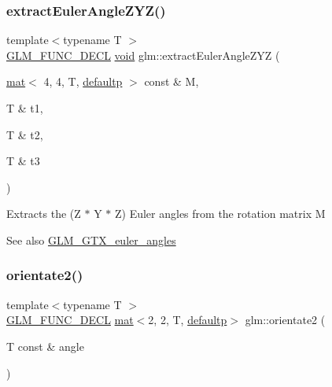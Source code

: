 \subsubsection{\texorpdfstring{extract\+Euler\+Angle\+Z\+Y\+Z()}{extractEulerAngleZYZ()}}
{\footnotesize\ttfamily template$<$typename T $>$ \\
\hyperlink{setup_8hpp_ab2d052de21a70539923e9bcbf6e83a51}{G\+L\+M\+\_\+\+F\+U\+N\+C\+\_\+\+D\+E\+CL} \hyperlink{_s_d_l__opengles2__gl2ext_8h_ae5d8fa23ad07c48bb609509eae494c95}{void} glm\+::extract\+Euler\+Angle\+Z\+YZ (\begin{DoxyParamCaption}\item[{\hyperlink{structglm_1_1mat}{mat}$<$ 4, 4, T, \hyperlink{namespaceglm_a36ed105b07c7746804d7fdc7cc90ff25a9d21ccd8b5a009ec7eb7677befc3bf51}{defaultp} $>$ const \&}]{M,  }\item[{T \&}]{t1,  }\item[{T \&}]{t2,  }\item[{T \&}]{t3 }\end{DoxyParamCaption})}

Extracts the (Z $\ast$ Y $\ast$ Z) Euler angles from the rotation matrix M \begin{DoxySeeAlso}{See also}
\hyperlink{group__gtx__euler__angles}{G\+L\+M\+\_\+\+G\+T\+X\+\_\+euler\+\_\+angles} 
\end{DoxySeeAlso}
\mbox{\label{group__gtx__euler__angles_gae16738a9f1887cf4e4db6a124637608d}} 
\subsubsection{\texorpdfstring{orientate2()}{orientate2()}}
{\footnotesize\ttfamily template$<$typename T $>$ \\
\hyperlink{setup_8hpp_ab2d052de21a70539923e9bcbf6e83a51}{G\+L\+M\+\_\+\+F\+U\+N\+C\+\_\+\+D\+E\+CL} \hyperlink{structglm_1_1mat}{mat}$<$2, 2, T, \hyperlink{namespaceglm_a36ed105b07c7746804d7fdc7cc90ff25a9d21ccd8b5a009ec7eb7677befc3bf51}{defaultp}$>$ glm\+::orientate2 (\begin{DoxyParamCaption}\item[{T const \&}]{angle }\end{DoxyParamCaption})}

